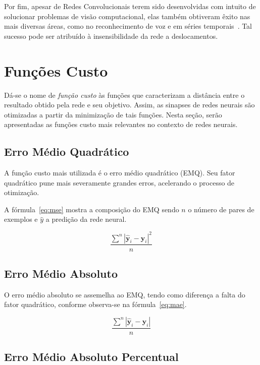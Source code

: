 Por fim, apesar de Redes Convolucionais terem sido desenvolvidas com intuito de solucionar problemas de visão computacional, elas também obtiveram êxito nas mais diversas áreas, como no reconhecimento de voz e em séries temporais~\cite{lecun95}. Tal sucesso pode ser atribuído à insensibilidade da rede a deslocamentos.


\section{Funções Custo} \label{sec:custo}

Dá-se o nome de \textit{função custo} às funções que caracterizam a distância entre o resultado obtido pela rede e seu objetivo. Assim, as sinapses de redes neurais são otimizadas a partir da minimização de tais funções. Nesta seção, serão apresentadas as funções custo mais relevantes no contexto de redes neurais.

\subsection{Erro Médio Quadrático}

A função custo mais utilizada é o erro médio quadrático (EMQ). Seu fator quadrático pune mais severamente grandes erros, acelerando o processo de otimização.

A fórmula~\ref{eq:mse} mostra a composição do EMQ sendo $n$ o número de pares de exemplos e $\hat{y}$ a predição da rede neural.

\begin{equation} \label{eq:mse}
    \frac{\displaystyle\sum^n |\hat{\mathbf{y}}_i - \mathbf{y}_i|^2}{n}
\end{equation}

\subsection{Erro Médio Absoluto}

O erro médio absoluto se assemelha ao EMQ, tendo como diferença a falta do fator quadrático, conforme observa-se na fórmula~\ref{eq:mae}.

\begin{equation} \label{eq:mae}
    \frac{\displaystyle\sum^n |\hat{\mathbf{y}}_i - \mathbf{y}_i|}{n}
\end{equation}

\subsection{Erro Médio Absoluto Percentual}

